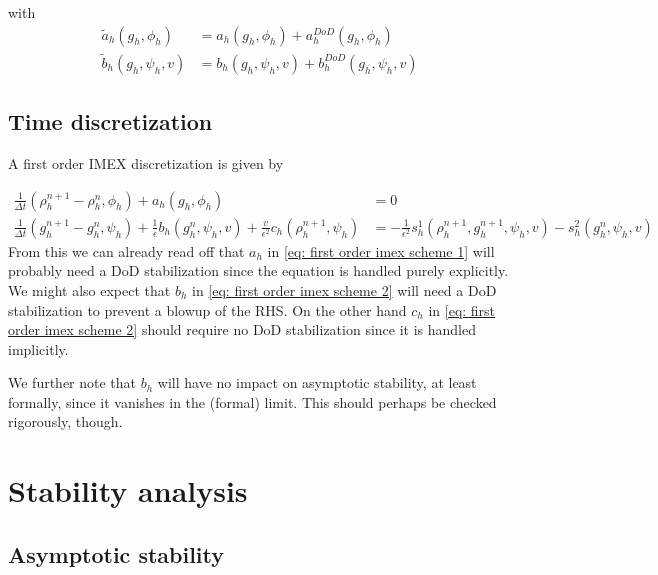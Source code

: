 \documentclass[]{article}
\begin{document}
with
\begin{subequations}
	\begin{align}
		\tilde{a}_h(g_h, \phi_h) & = a_h(g_h, \phi_h)  + a_h^{DoD}(g_h, \phi_h) \\
		\tilde{b}_h(g_h, \psi_h, v) & = b_h(g_h, \psi_h, v)  + b_h^{DoD}(g_h, \psi_h, v) 
	\end{align}
\end{subequations}

\subsection{Time discretization}

A first order IMEX discretization is given by

\begin{subequations}
\begin{align}
\label{eq: first order imex scheme 1}  \frac{1}{\Delta t} (\rho_h^{n+1} - \rho_h^n, \phi_h) + a_h(g_h, \phi_h) & = 0 \\
\label{eq: first order imex scheme 2} \frac{1}{\Delta t} (g_h^{n+1} - g_h^n, \psi_h) + \frac{1}{\epsilon} b_h(g_h^n, \psi_h, v) + \frac{v}{\epsilon^2} c_h(\rho_h^{n+1}, \psi_h) & = - \frac{1}{\epsilon^2}s_h^1(\rho_h^{n+1}, g_h^{n+1}, \psi_h, v) - s_h^2(g_h^n, \psi_h, v)
\end{align}
\end{subequations}
From this we can already read off that $a_h$ in \eqref{eq: first order imex scheme 1} will probably need a DoD stabilization since the equation is handled purely explicitly. We might also expect that $b_h$ in \eqref{eq: first order imex scheme 2} will need a DoD stabilization to prevent a blowup of the RHS. On the other hand $c_h$ in \eqref{eq: first order imex scheme 2} should require no DoD stabilization since it is handled implicitly.

We further note that $b_h$ will have no impact on asymptotic stability, at least formally, since it vanishes in the (formal) limit. This should perhaps be checked rigorously, though.

\section{Stability analysis}

\subsection{Asymptotic stability}
\end{document}
